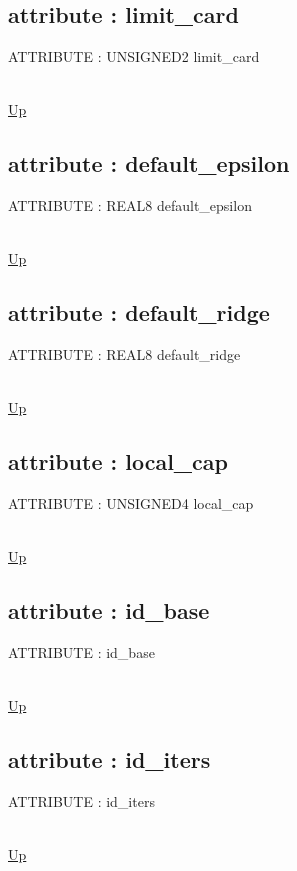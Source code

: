 \subsection*{attribute : limit\_card}
\hypertarget{ecldoc:logisticregression.constants.limit_card}{ATTRIBUTE : UNSIGNED2 limit\_card} \\
\hyperlink{ecldoc:LogisticRegression.Constants}{Up} \\
\par
\subsection*{attribute : default\_epsilon}
\hypertarget{ecldoc:logisticregression.constants.default_epsilon}{ATTRIBUTE : REAL8 default\_epsilon} \\
\hyperlink{ecldoc:LogisticRegression.Constants}{Up} \\
\par
\subsection*{attribute : default\_ridge}
\hypertarget{ecldoc:logisticregression.constants.default_ridge}{ATTRIBUTE : REAL8 default\_ridge} \\
\hyperlink{ecldoc:LogisticRegression.Constants}{Up} \\
\par
\subsection*{attribute : local\_cap}
\hypertarget{ecldoc:logisticregression.constants.local_cap}{ATTRIBUTE : UNSIGNED4 local\_cap} \\
\hyperlink{ecldoc:LogisticRegression.Constants}{Up} \\
\par
\subsection*{attribute : id\_base}
\hypertarget{ecldoc:logisticregression.constants.id_base}{ATTRIBUTE : id\_base} \\
\hyperlink{ecldoc:LogisticRegression.Constants}{Up} \\
\par
\subsection*{attribute : id\_iters}
\hypertarget{ecldoc:logisticregression.constants.id_iters}{ATTRIBUTE : id\_iters} \\
\hyperlink{ecldoc:LogisticRegression.Constants}{Up} \\
\par
